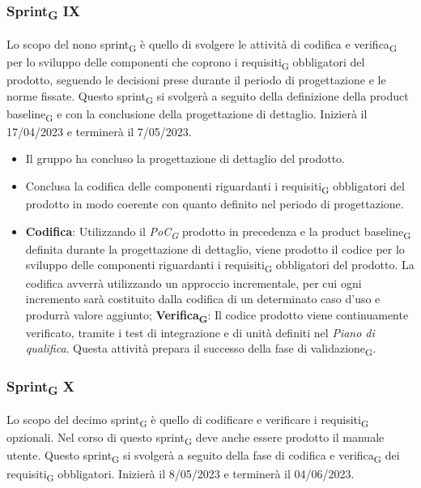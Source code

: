 \subsubsection{Sprint\textsubscript{G} IX}
Lo scopo del nono sprint\textsubscript{G} è quello di svolgere le attività di codifica e verifica\textsubscript{G} per lo sviluppo delle componenti che coprono i requisiti\textsubscript{G} obbligatori 
del prodotto, seguendo le decisioni prese durante il periodo di progettazione e le norme fissate.
Questo sprint\textsubscript{G} si svolgerà a seguito della definizione della product baseline\textsubscript{G} e con la conclusione della progettazione di dettaglio. Inizierà il 17/04/2023 e terminerà il 7/05/2023.

\:
\begin{itemize}
	\item Il gruppo ha concluso la progettazione di dettaglio del prodotto.
\end{itemize}

\:
\begin{itemize}
	\item Conclusa la codifica delle componenti riguardanti i requisiti\textsubscript{G} obbligatori del prodotto in modo coerente con quanto definito nel periodo di progettazione.
\end{itemize}

\:
\begin{itemize}
	\item \textbf{Codifica}: Utilizzando il \textit{PoC\textsubscript{G}} prodotto in precedenza e la product baseline\textsubscript{G} definita durante la progettazione di dettaglio, viene prodotto il codice per lo sviluppo delle componenti riguardanti i requisiti\textsubscript{G} obbligatori del prodotto. La codifica avverrà utilizzando un approccio incrementale, per cui ogni incremento sarà costituito dalla codifica di un determinato caso d’uso e produrrà valore aggiunto;
	\subitem \textbf{Verifica\textsubscript{G}}: Il codice prodotto viene continuamente verificato, tramite i test di integrazione e di unità definiti nel \textit{Piano di qualifica}. Questa attività prepara il successo della fase di validazione\textsubscript{G}.
\end{itemize}

\subsubsection{Sprint\textsubscript{G} X}
Lo scopo del decimo sprint\textsubscript{G} è quello di codificare e verificare i requisiti\textsubscript{G} opzionali. Nel corso di questo sprint\textsubscript{G} deve anche essere prodotto il manuale utente.
Questo sprint\textsubscript{G} si svolgerà a seguito della fase di codifica e verifica\textsubscript{G} dei requisiti\textsubscript{G} obbligatori. Inizierà il 8/05/2023 e terminerà il 04/06/2023.

